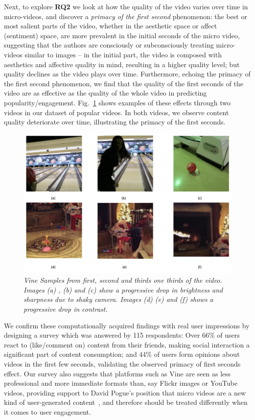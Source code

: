Next, to explore \textbf{RQ2} we look at how the quality of the video varies over time in micro-videos, and discover a \emph{primacy of the first second} phenomenon: the best or most salient parts of the video, whether in the aesthetic space or affect (sentiment) space, are more prevalent in the initial seconds of the micro video, suggesting that the authors are consciously or subconsciously treating micro-videos similar to images -- in the initial part, the video is composed with aesthetics and affective quality in mind, resulting in a higher quality level; but quality declines as the video plays over time. Furthermore, echoing the primacy of the first second phenomenon, we find that the quality of the first seconds of the video are as effective as the quality of the whole video in predicting popularity/engagement. Fig.~\ref{fig:Vine_samples} shows examples of these effects through two videos in our dataset of popular videos. In both videos, we observe content quality deteriorate over time, illustrating the primacy of the first seconds. 

\begin{figure}[!tbh]
    \centering
    \includegraphics[width=0.7\columnwidth]{Vine_samples2.png}
    \caption{\textsl{ Vine Samples from first, second and thirds one thirds of the video. Images (a) , (b) and (c) show a progressive drop in brightness and sharpness due to shaky camera. Images (d) (e) and (f) shows a progressive drop in contrast.}}
    \label{fig:Vine_samples}
\end{figure}

We confirm these computationally acquired findings with real user impressions by designing a survey which was answered by 115 respondents: Over 66\% of users react to (like/comment on) content from their friends, making social interaction a significant part of content consumption; and 44\% of users form opinions about videos in the first few seconds, validating the observed primacy of first seconds effect. Our survey also suggests that platforms such as Vine are seen as less professional and more immediate formats than, say Flickr images or YouTube videos, providing support to David Pogue's  position that micro videos are a new kind of user-generated content~\cite{pogue13}, and therefore should be treated differently when it comes to user engagement.



